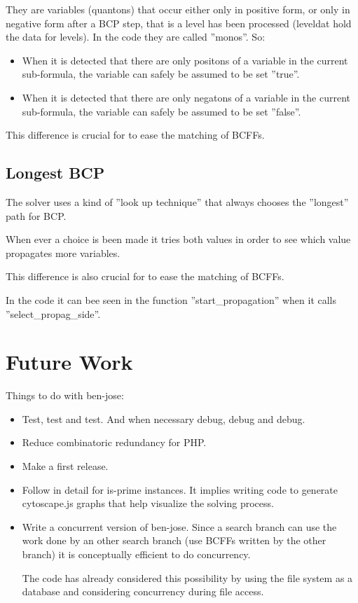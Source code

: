 \documentclass{easychair}
\newcommand{\quanton}{\textsf{quanton}}
\newcommand{\leveldat}{\textsf{leveldat}}
\begin{document}
They are variables ({\quanton}s) that occur either only in positive form, or only in negative form after a BCP step, that is a level has been processed ({\leveldat} hold the data for levels). In the code they are called ''monos''. So:

\begin{itemize}
\item
When it is detected that there are only positons of a variable in the current sub-formula, the variable can safely be assumed to be set ''true''. 

\item
When it is detected that there are only negatons of a variable in the current sub-formula, the variable can safely be assumed to be set ''false''. 
\end{itemize}

This difference is crucial for to ease the matching of BCFFs.

\subsection{Longest BCP}

The solver uses a kind of ''look up technique'' that always chooses the ''longest'' path for BCP. 

When ever a choice is been made it tries both values in order to see which value propagates more variables. 

This difference is also crucial for to ease the matching of BCFFs.

In the code it can bee seen in the function ''start\_propagation'' when it calls ''select\_propag\_side''.

\section{Future Work}
\label{sect:future-work}

Things to do with ben-jose:

\begin{itemize}
\item
Test, test and test. And when necessary debug, debug and debug.

\item
Reduce combinatoric redundancy for PHP.

\item
Make a first release.

\item
Follow in detail for is-prime instances. It implies writing code to generate cytoscape.js graphs that help visualize the solving process.

\item
Write a concurrent version of ben-jose. Since a search branch can use the work done by an other search branch (use BCFFs written by the other branch) it is conceptually efficient to do concurrency.

The code has already considered this possibility by using the file system as a database and considering concurrency during file access.

\end{itemize}
\end{document}
